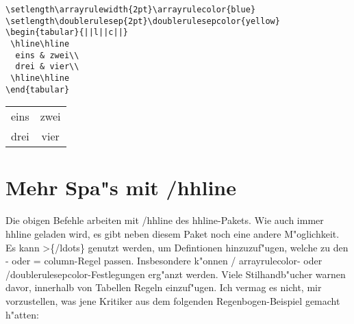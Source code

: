 \documentclass[ngerman]{article}
\begin{document}
\begin{center}
\setlength\arrayrulewidth{2pt}
\setlength\doublerulesep{2pt}

\begin{minipage}{.75\textwidth}
\begin{verbatim}
\setlength\arrayrulewidth{2pt}\arrayrulecolor{blue}
\setlength\doublerulesep{2pt}\doublerulesepcolor{yellow}
\begin{tabular}{||l||c||}
 \hline\hline
  eins & zwei\\
  drei & vier\\
 \hline\hline
\end{tabular}
\end{verbatim}
\end{minipage}
 {\bfseries
  \begin{tabular}{|l||c||}
  \hline\hline
  eins&zwei\\
  drei&vier\\
  \hline\hline
  \end{tabular}}
 \end{center}

 \section{Mehr Spa"s mit \slash \textsf{hhline}}

Die obigen Befehle arbeiten mit \slash \textsf{hhline} des \textsf{hhline}-Pakets. Wie auch 
immer\\
\textsf{hhline} geladen wird, es gibt neben diesem Paket noch eine andere M"oglichkeit. Es 
kann >\{\slash \textsf{ldots}\} genutzt werden, um Defintionen hinzuzuf"ugen, welche zu den
- oder = \textsf{column}-Regel passen. Insbesondere k"onnen \slash
  \textsf{arrayrulecolor}- oder  \slash \textsf{doublerulesepcolor}-Festlegungen erg"anzt werden. 
Viele Stilhandb"ucher warnen davor, innerhalb von Tabellen Regeln
einzuf"ugen. Ich vermag es nicht, mir 
vorzustellen, was jene Kritiker aus dem folgenden Regenbogen-Beispiel gemacht h"atten:
\end{document}
